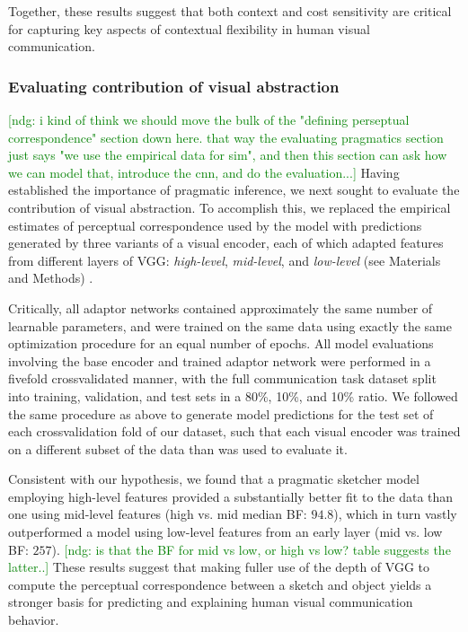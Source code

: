 \documentclass[9pt,twocolumn,twoside]{pnas-new}
\newcommand{\ndg}[1]{\textcolor{Green}{[ndg: #1]}}
\begin{document}
Together, these results suggest that both context and cost sensitivity are critical for capturing key aspects of contextual flexibility in human visual communication. 

\subsubsection*{Evaluating contribution of visual abstraction}
\ndg{i kind of think we should move the bulk of the "defining perseptual correspondence" section down here. that way the evaluating pragmatics section just says "we use the empirical data for sim", and then this section can ask how we can model that, introduce the cnn, and do the evaluation...}
Having established the importance of pragmatic inference, we next sought to evaluate the contribution of visual abstraction.
To accomplish this, we replaced the empirical estimates of perceptual correspondence used by the model with predictions generated by three variants of a visual encoder, each of which adapted features from different layers of VGG: \textit{high-level}, \textit{mid-level}, and \textit{low-level} (see Materials and Methods) .

Critically, all adaptor networks contained approximately the same number of learnable parameters, and were trained on the same data using exactly the same optimization procedure for an equal number of epochs. 
All model evaluations involving the base encoder and trained adaptor network were performed in a fivefold crossvalidated manner, with the full communication task dataset split into training, validation, and test sets in a 80\%, 10\%, and 10\% ratio. 
We followed the same procedure as above to generate model predictions for the test set of each crossvalidation fold of our dataset, such that each visual encoder was trained on a different subset of the data than was used to evaluate it. 

Consistent with our hypothesis, we found that a pragmatic sketcher model employing high-level features provided a substantially better fit to the data than one using mid-level features (high vs. mid median BF: $94.8$), which in turn vastly outperformed a model using low-level features from an early layer (mid vs. low BF: $257$). \ndg{is that the BF for mid vs low, or high vs low? table suggests the latter..}
These results suggest that making fuller use of the depth of VGG to compute the perceptual correspondence between a sketch and object yields a stronger basis for predicting and explaining human visual communication behavior.
\end{document}
